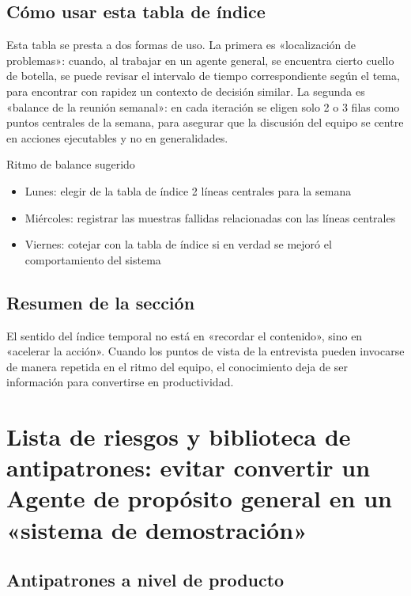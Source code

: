 \documentclass[a4paper]{article}
\begin{document}
\subsection{Cómo usar esta tabla de índice}

Esta tabla se presta a dos formas de uso. La primera es «localización de problemas»: cuando, al trabajar en un agente general, se encuentra cierto cuello de botella, se puede revisar el intervalo de tiempo correspondiente según el tema, para encontrar con rapidez un contexto de decisión similar. La segunda es «balance de la reunión semanal»: en cada iteración se eligen solo 2 o 3 filas como puntos centrales de la semana, para asegurar que la discusión del equipo se centre en acciones ejecutables y no en generalidades.

\begin{importantbox}{Ritmo de balance sugerido}
\begin{itemize}
    \item Lunes: elegir de la tabla de índice 2 líneas centrales para la semana
    \item Miércoles: registrar las muestras fallidas relacionadas con las líneas centrales
    \item Viernes: cotejar con la tabla de índice si en verdad se mejoró el comportamiento del sistema
\end{itemize}
\end{importantbox}

\subsection{Resumen de la sección}

El sentido del índice temporal no está en «recordar el contenido», sino en «acelerar la acción». Cuando los puntos de vista de la entrevista pueden invocarse de manera repetida en el ritmo del equipo, el conocimiento deja de ser información para convertirse en productividad.


\section{Lista de riesgos y biblioteca de antipatrones: evitar convertir un Agente de propósito general en un «sistema de demostración»}

\subsection{Antipatrones a nivel de producto}
\end{document}
